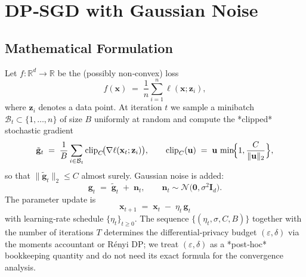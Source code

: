 \documentclass{article}
\begin{document}
\section*{DP‑SGD with Gaussian Noise}

\subsection*{Mathematical Formulation}
Let $f:\mathbb{R}^d\!\to\!\mathbb{R}$ be the (possibly non‑convex) loss
\[
    f(\mathbf{x}) \;=\; \frac{1}{n}\sum_{i=1}^{n}\ell(\mathbf{x};\mathbf{z}_i),
\]
where $\mathbf{z}_i$ denotes a data point.  
At iteration $t$ we sample a minibatch $\mathcal{B}_t\subset\{1,\dots,n\}$ of size $B$ uniformly at random and compute the *clipped* stochastic gradient
\[
    \tilde{\mathbf{g}}_t
    \;=\;\frac{1}{B}\sum_{i\in\mathcal{B}_t}
    \operatorname{clip}_C\!\bigl(\nabla\ell(\mathbf{x}_t;\mathbf{z}_i)\bigr),
    \qquad 
    \operatorname{clip}_C(\mathbf{u})\;=\;
    \mathbf{u}\,\min\!\Bigl\{1,\frac{C}{\|\mathbf{u}\|_2}\Bigr\},
\]
so that $\|\tilde{\mathbf{g}}_t\|_2\le C$ almost surely.  
Gaussian noise is added:
\[
    \mathbf{g}_t \;=\; \tilde{\mathbf{g}}_t \;+\; \mathbf{n}_t,
    \qquad
    \mathbf{n}_t\sim\mathcal{N}\bigl(\mathbf{0},\sigma^2\mathbf{I}_d\bigr).
\]
The parameter update is
\[
    \boxed{\;\mathbf{x}_{t+1}
    \;=\;\mathbf{x}_t \;-\; \eta_t \,\mathbf{g}_t\;}
\tag{1}
\]
with learning‑rate schedule $\{\eta_t\}_{t\ge0}$.
The sequence $\{(\eta_t,\sigma,C,B)\}$ together with the number of
iterations $T$ determines the differential‑privacy budget $(\varepsilon,\delta)$ via the moments accountant or Rényi DP; we treat $(\varepsilon,\delta)$ as a *post‑hoc* bookkeeping quantity and do not need its exact formula for the convergence analysis.
\end{document}
